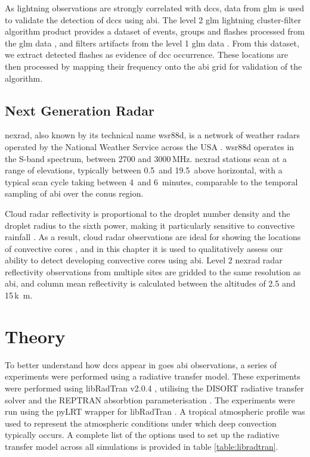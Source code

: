 As lightning observations are strongly correlated with \acrshort{dcc}s, data from \acrshort{glm} is used to validate the detection of \acrshort{dcc}s using \acrshort{abi}.
The level 2 \acrshort{glm} lightning cluster-filter algorithm product provides a dataset of events, groups and flashes processed from the \acrshort{glm} data \citep{peterson_research_2019}, and filters artifacts from the level 1 \acrshort{glm} data \citep{peterson_removing_2020}.
From this dataset, we extract detected flashes as evidence of \acrshort{dcc} occurrence.
These locations are then processed by mapping their frequency onto the \acrshort{abi} grid for validation of the algorithm.

\subsection{Next Generation Radar}

\acrshort{nexrad}, also known by its technical name \acrfull{wsr88d}, is a network of weather radars operated by the National Weather Service across the USA \citep{crum_wsr-88d_1993}.
\acrshort{wsr88d} operates in the S-band spectrum, between 2700 and 3000\,\unit{MHz}.
\acrshort{nexrad} stations scan at a range of elevations, typically between 0.5\textdegree\ and 19.5\textdegree\ above horizontal, with a typical scan cycle taking between 4\, and 6~minutes, comparable to the temporal sampling of \acrshort{abi} over the \acrshort{conus} region.

Cloud radar reflectivity is proportional to the droplet number density and the droplet radius to the sixth power, making it particularly sensitive to convective rainfall \citep{yau_short_1989}.
As a result, cloud radar observations are ideal for showing the locations of convective cores \citep{austin_relation_1987, rosenfeld_general_1993, zipser_vertical_1994}, and in this chapter it is used to qualitatively assess our ability to detect developing convective cores using \acrshort{abi}.
Level 2 \acrshort{nexrad} radar reflectivity observations from multiple sites are gridded to the same resolution as \acrshort{abi}, and column mean reflectivity is calculated between the altitudes of 2.5 and 15\,\unit{k m}.

\section{Theory} \label{sec:detection_theory}

To better understand how \acrshort{dcc}s appear in \acrshort{goes} \acrshort{abi} observations, a series of experiments were performed using a radiative transfer model.
These experiments were performed using libRadTran v2.0.4 \citep{emde_libradtran_2016}, utilising the DISORT radiative transfer solver \citep{buras_new_2011} and the REPTRAN absorbtion parameterisation \citep{gasteiger_representative_2014}.
The experiments were run using the pyLRT wrapper for libRadTran \citep{gryspeerdt_pylrt_2024}.
A tropical atmospheric profile was used to represent the atmospheric conditions under which deep convection typically occurs.
A complete list of the options used to set up the radiative transfer model across all simulations is provided in table \ref{table:libradtran}.

